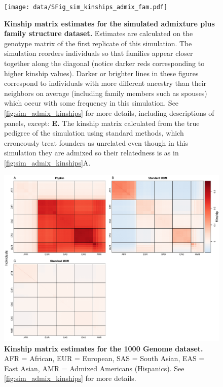 \documentclass[11pt]{article}
\begin{document}
\begin{figure}[bp!]
  \centering
  \texttt{[image: data/SFig\_sim\_kinships\_admix\_fam.pdf]}
  \caption{
    {\bf Kinship matrix estimates for the simulated admixture plus family structure dataset.}
    Estimates are calculated on the genotype matrix of the first replicate of this simulation.
    The simulation reorders individuals so that families appear closer together along the diagonal (notice darker reds corresponding to higher kinship values).  Darker or brighter lines in these figures correspond to individuals with more different ancestry than their neighbors on average (including family members such as spouses) which occur with some frequency in this simulation.
    See \cref{fig:sim_admix_kinships} for more details, including descriptions of panels, except: \textbf{E.} The kinship matrix calculated from the true pedigree of the simulation using standard methods, which erroneously treat founders as unrelated even though in this simulation they are admixed so their relatedness is as in \cref{fig:sim_admix_kinships}A.
    }
  \label{fig:sim_admix_fam_kinships}
\end{figure}

\begin{figure}[bp!]
  \centering
  \includegraphics[width=\textwidth]{data/SFig_TGP_kinships.pdf}
  \caption{
    {\bf Kinship matrix estimates for the 1000 Genome dataset.} AFR = African, EUR = European, SAS = South Asian, EAS = East Asian, AMR = Admixed Americans (Hispanics).
    See \cref{fig:sim_admix_kinships} for more details.
    }
  \label{fig:TGP_kinships}
\end{figure}
\end{document}
